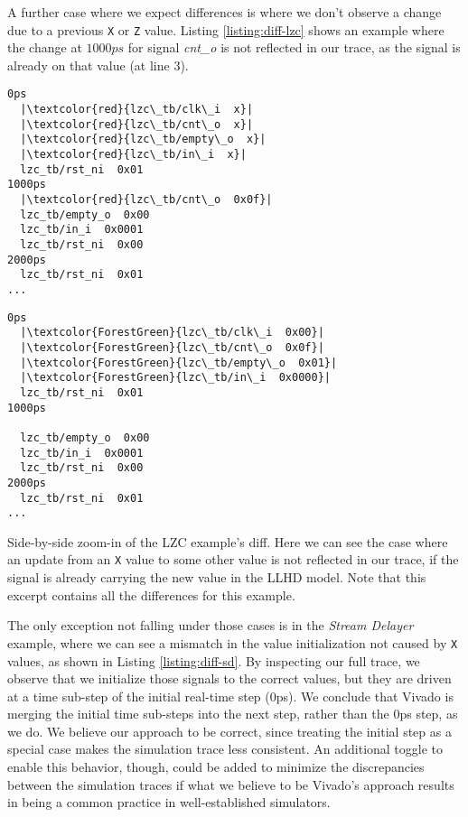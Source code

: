 A further case where we expect differences is where we don't observe a change due to a previous \texttt{X} or \texttt{Z} value. Listing \ref{listing:diff-lzc} shows an example where the change at $1000ps$ for signal \textit{cnt\_o} is not reflected in our trace, as the signal is already on that value (at line $3$).


\begin{listing}[ht]
  \lstset{
    escapeinside=||,
    basicstyle=\footnotesize\ttfamily,
    stepnumber=1
  }
  \begin{minipage}{0.45\textwidth}
    \begin{lstlisting}
0ps
  |\textcolor{red}{lzc\_tb/clk\_i  x}|
  |\textcolor{red}{lzc\_tb/cnt\_o  x}|
  |\textcolor{red}{lzc\_tb/empty\_o  x}|
  |\textcolor{red}{lzc\_tb/in\_i  x}|
  lzc_tb/rst_ni  0x01
1000ps
  |\textcolor{red}{lzc\_tb/cnt\_o  0x0f}|
  lzc_tb/empty_o  0x00
  lzc_tb/in_i  0x0001
  lzc_tb/rst_ni  0x00
2000ps
  lzc_tb/rst_ni  0x01
...
        \end{lstlisting}
  \end{minipage}
  \hfill
  \begin{minipage}{0.45\textwidth}
    \begin{lstlisting}
0ps
  |\textcolor{ForestGreen}{lzc\_tb/clk\_i  0x00}|
  |\textcolor{ForestGreen}{lzc\_tb/cnt\_o  0x0f}|
  |\textcolor{ForestGreen}{lzc\_tb/empty\_o  0x01}|
  |\textcolor{ForestGreen}{lzc\_tb/in\_i  0x0000}|
  lzc_tb/rst_ni  0x01
1000ps

  lzc_tb/empty_o  0x00
  lzc_tb/in_i  0x0001
  lzc_tb/rst_ni  0x00
2000ps
  lzc_tb/rst_ni  0x01
...
        \end{lstlisting}
  \end{minipage}
  \caption[Side-by-side zoom-in of the LZC example's diff.]{Side-by-side zoom-in of the LZC example's diff. Here we can see the case where an update from an \texttt{X} value to some other value is not reflected in our trace, if the signal is already carrying the new value in the LLHD model. Note that this excerpt contains all the differences for this example.}
  \label{listing:diff-lzc}
\end{listing}

The only exception not falling under those cases is in the \textit{Stream Delayer} example, where we can see a mismatch in the value initialization not caused by \texttt{X} values, as shown in Listing \ref{listing:diff-sd}. By inspecting our full trace, we observe that we initialize those signals to the correct values, but they are driven at a time sub-step of the initial real-time step ($0$ps). We conclude that Vivado is merging the initial time sub-steps into the next step, rather than the $0$ps step, as we do. We believe our approach to be correct, since treating the initial step as a special case makes the simulation trace less consistent. An additional toggle to enable this behavior, though, could be added to minimize the discrepancies between the simulation traces if what we believe to be Vivado's approach results in being a common practice in well-established simulators.

